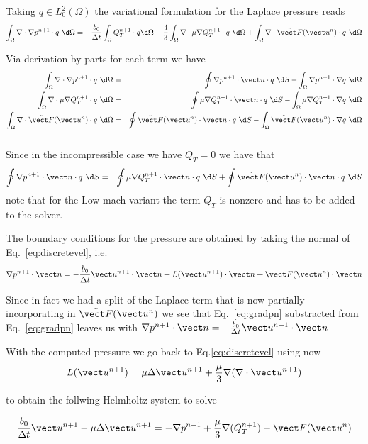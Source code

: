 Taking $q\in L^2_0(\Omega)$ the variational formulation for the Laplace pressure reads
\begin{eqnarray}
\int_{\Omega}\nabla\cdot \nabla p^{n+1}\cdot q\ \d \Omega=-\frac{b_0}{\Delta t} \int_{\Omega}Q_T^{n+1} \cdot q \d \Omega-\frac{4}{3}\int_{\Omega}\nabla\cdot \mu\nabla Q_T^{n+1} \cdot q\ \d \Omega+\int_{\Omega}\nabla\cdot \tilde{\vect F}(\vect u^n)\cdot q \ \d \Omega
\end{eqnarray}

Via derivation by parts for each term we have
\begin{eqnarray}
\int_{\Omega}\nabla\cdot \nabla p^{n+1}\cdot q\ \d \Omega &=&\oint\nabla p^{n+1}\cdot\vect n\cdot q\ \d S-\int_{\Omega}\nabla p^{n+1}\cdot \nabla q\ \d \Omega \\ \nonumber
\int_{\Omega}\nabla\cdot \mu\nabla Q_T^{n+1} \cdot q\ \d \Omega &=& \oint \mu\nabla Q_T^{n+1} \cdot \vect n \cdot q \ \d S- \int_{\Omega} \mu\nabla Q_T^{n+1} \cdot \nabla q\ \d \Omega \\ \nonumber
\int_{\Omega}\nabla\cdot \tilde{\vect F}(\vect u^n)\cdot q\ \d \Omega &=& \oint \tilde{\vect F}(\vect u^n)\cdot \vect n\cdot q\ \d S -\int_{\Omega}\tilde{\vect F}(\vect u^n)\cdot \nabla q\ \d \Omega \\ \nonumber
\end{eqnarray}
Since in the incompressible case we have $Q_T=0$ we have that
\begin{eqnarray}
\oint\nabla p^{n+1}\cdot\vect n\cdot q\ \d S&=& \oint \mu\nabla Q_T^{n+1} \cdot \vect n \cdot q \ \d S+ \oint \tilde{\vect F}(\vect u^n)\cdot \vect n\cdot q\ \d S 
\end{eqnarray}\label{eq:gradpn_var}
note that for the Low mach variant the term $Q_T$ is nonzero and has to be added to the solver.


The boundary conditions for the pressure are obtained by taking the normal of Eq.~\ref{eq:discretevel}, i.e.
\begin{eqnarray}
 \nabla p^{n+1}\cdot \vect n = -\frac{b_0}{\Delta t} \vect u^{n+1}\cdot \vect n +L(\vect u^{n+1})\cdot \vect n+\vect F(\vect u^{n})\cdot \vect n
\end{eqnarray}\label{eq:gradpn}

Since in fact we had a split of the Laplace term that is now partially incorporating in  $\tilde{\vect F}(\vect u^{n})$ we see that Eq.~\ref{eq:gradpn} substracted from Eq.~\ref{eq:gradpn} leaves us with 
$ \nabla p^{n+1}\cdot \vect n = -\frac{b_0}{\Delta t} \vect u^{n+1}\cdot \vect n $


With the computed pressure we go back to Eq.\ref{eq:discretevel} using now
\begin{equation}
L(\vect u^{n+1})= \mu\Delta \vect u^{n+1}+\frac{\mu}{3}\nabla (\nabla\cdot \vect u^{n+1}) 
\end{equation}

to obtain the follwing Helmholtz system to solve

\begin{eqnarray}
\frac{b_0}{\Delta t} \vect u^{n+1} -\mu\Delta \vect u^{n+1}= - \nabla p^{n+1}+\frac{\mu}{3}\nabla (Q_T^{n+1})-\vect F(\vect u^{n})
\end{eqnarray}

